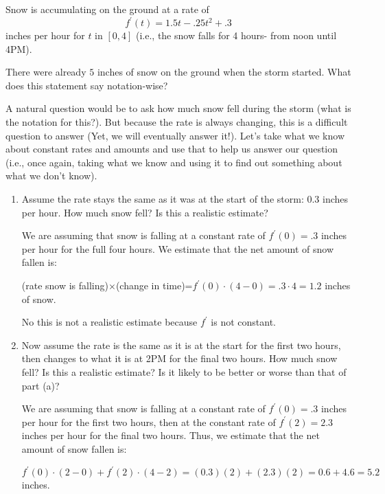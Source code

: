 \documentclass[handout,nooutcomes]{ximera}
\begin{document}
\begin{problem}
Snow is accumulating on the ground at a rate of  
$$f^\prime (t)=1.5t-.25 t^2+.3$$
inches per hour for $t$ in $[0,4]$ (i.e., the snow falls for 4 hours- from noon until 4PM).  

There were already $5$ inches of snow on the ground when the storm started.  What does this statement say notation-wise?

A natural question would be to ask how much snow fell during the storm (what is the notation for this?).  But because the rate is always changing, this is a difficult question to answer (Yet, we will eventually answer it!).  Let’s take what we know about constant rates and amounts and use that to help us answer our question (i.e., once again, taking what we know and using it to find out something about what we don’t know).

	\begin{enumerate}
	
	\item  Assume the rate stays the same as it was at the start of the storm: 0.3 inches per hour.  How much snow fell?  Is this a realistic estimate?
		\begin{freeResponse}
		We are assuming that snow is falling at a constant rate of $f^\prime (0)=.3$ inches per hour for the full four hours.  We estimate that the net amount of snow fallen is:
		
		  (rate snow is falling)$\times$(change in time)=$f^\prime (0) \cdot (4-0) =.3 \cdot 4=1.2$ inches of snow.  
		  
		  No this is not a realistic estimate because $f^\prime$ is not constant.
		\end{freeResponse}
		
		
		
	\item  Now assume the rate is the same as it is at the start for the first two hours, then changes to what it is at 2PM for the final two hours.  How much snow fell?  Is this a realistic estimate?  Is it likely to be better or worse than that of part (a)?
		\begin{freeResponse}
		We are assuming that snow is falling at a constant rate of $f^\prime (0)=.3$ inches per hour for the first two hours, then at the constant rate of $f^\prime (2)=2.3$ inches per hour for the final two hours.  Thus, we estimate that the net amount of snow fallen is:
		
		  $f^\prime (0)\cdot (2-0)+ f^\prime (2) \cdot (4-2)= (0.3)(2) + (2.3)(2) = 0.6+4.6=5.2$ inches.
		  

\end{freeResponse}
\end{enumerate}
\end{problem}
\end{document}
